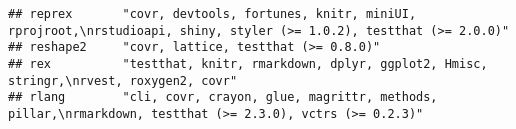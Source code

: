 \documentclass[]{book}
\begin{document}
\begin{verbatim}
## reprex       "covr, devtools, fortunes, knitr, miniUI, rprojroot,\nrstudioapi, shiny, styler (>= 1.0.2), testthat (>= 2.0.0)"                                                                                                                                                                                                                                                                                                                                                                                                                                                                                                                                                                                          
## reshape2     "covr, lattice, testthat (>= 0.8.0)"                                                                                                                                                                                                                                                                                                                                                                                                                                                                                                                                                                                                                                                                      
## rex          "testthat, knitr, rmarkdown, dplyr, ggplot2, Hmisc, stringr,\nrvest, roxygen2, covr"                                                                                                                                                                                                                                                                                                                                                                                                                                                                                                                                                                                                                      
## rlang        "cli, covr, crayon, glue, magrittr, methods, pillar,\nrmarkdown, testthat (>= 2.3.0), vctrs (>= 0.2.3)"                                                                                                                                                                                                                                                                                                                                                                                                                                                                                                                                                                                                   

\end{verbatim}
\end{document}
